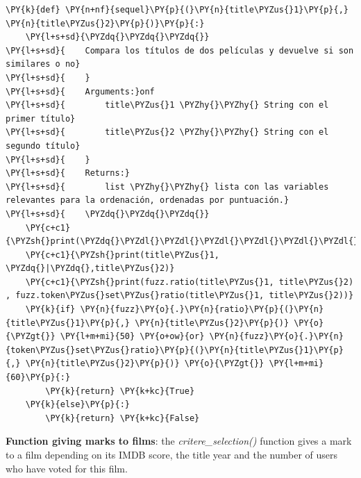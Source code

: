     \begin{tcolorbox}[breakable, size=fbox, boxrule=1pt, pad at break*=1mm,colback=cellbackground, colframe=cellborder]
\begin{Verbatim}[commandchars=\\\{\}]
\PY{k}{def} \PY{n+nf}{sequel}\PY{p}{(}\PY{n}{title\PYZus{}1}\PY{p}{,} \PY{n}{title\PYZus{}2}\PY{p}{)}\PY{p}{:}   
    \PY{l+s+sd}{\PYZdq{}\PYZdq{}\PYZdq{}}
\PY{l+s+sd}{    Compara los títulos de dos películas y devuelve si son similares o no}
\PY{l+s+sd}{    }
\PY{l+s+sd}{    Arguments:}onf
\PY{l+s+sd}{        title\PYZus{}1 \PYZhy{}\PYZhy{} String con el primer título}
\PY{l+s+sd}{        title\PYZus{}2 \PYZhy{}\PYZhy{} String con el segundo título}
\PY{l+s+sd}{    }
\PY{l+s+sd}{    Returns:}
\PY{l+s+sd}{        list \PYZhy{}\PYZhy{} lista con las variables relevantes para la ordenación, ordenadas por puntuación.}
\PY{l+s+sd}{    \PYZdq{}\PYZdq{}\PYZdq{}}
    \PY{c+c1}{\PYZsh{}print(\PYZdq{}\PYZdl{}\PYZdl{}\PYZdl{}\PYZdl{}\PYZdl{}\PYZdl{}\PYZdl{}\PYZdl{}\PYZdl{}\PYZdl{}\PYZdl{}\PYZdl{}\PYZdl{}\PYZdl{}\PYZdl{}\PYZdl{}\PYZdl{}\PYZdl{}\PYZdl{}\PYZdl{}\PYZdl{}\PYZdl{}\PYZdq{})}
    \PY{c+c1}{\PYZsh{}print(title\PYZus{}1, \PYZdq{}|\PYZdq{},title\PYZus{}2)}
    \PY{c+c1}{\PYZsh{}print(fuzz.ratio(title\PYZus{}1, title\PYZus{}2) , fuzz.token\PYZus{}set\PYZus{}ratio(title\PYZus{}1, title\PYZus{}2))}
    \PY{k}{if} \PY{n}{fuzz}\PY{o}{.}\PY{n}{ratio}\PY{p}{(}\PY{n}{title\PYZus{}1}\PY{p}{,} \PY{n}{title\PYZus{}2}\PY{p}{)} \PY{o}{\PYZgt{}} \PY{l+m+mi}{50} \PY{o+ow}{or} \PY{n}{fuzz}\PY{o}{.}\PY{n}{token\PYZus{}set\PYZus{}ratio}\PY{p}{(}\PY{n}{title\PYZus{}1}\PY{p}{,} \PY{n}{title\PYZus{}2}\PY{p}{)} \PY{o}{\PYZgt{}} \PY{l+m+mi}{60}\PY{p}{:}
        \PY{k}{return} \PY{k+kc}{True}
    \PY{k}{else}\PY{p}{:}
        \PY{k}{return} \PY{k+kc}{False}
\end{Verbatim}
\end{tcolorbox}

    \textbf{Function giving marks to films}: the \emph{critere\_selection()}
function gives a mark to a film depending on its IMDB score, the title
year and the number of users who have voted for this film.

